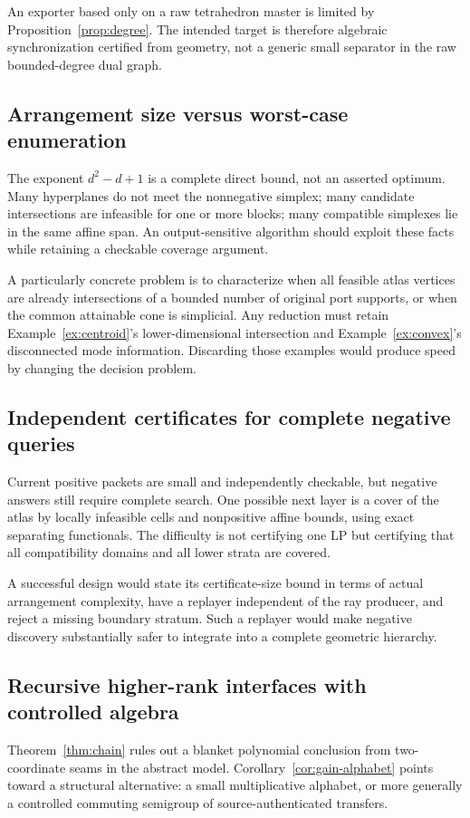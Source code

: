 \documentclass[11pt,a4paper]{article}
\theoremstyle{definition}
\theoremstyle{remark}
\begin{document}
An exporter based only on a raw tetrahedron master is limited by Proposition~\ref{prop:degree}. The intended target is therefore algebraic synchronization certified from geometry, not a generic small separator in the raw bounded-degree dual graph.

\subsection{Arrangement size versus worst-case enumeration}
The exponent $d^2-d+1$ is a complete direct bound, not an asserted optimum. Many hyperplanes do not meet the nonnegative simplex; many candidate intersections are infeasible for one or more blocks; many compatible simplexes lie in the same affine span. An output-sensitive algorithm should exploit these facts while retaining a checkable coverage argument.

A particularly concrete problem is to characterize when all feasible atlas vertices are already intersections of a bounded number of original port supports, or when the common attainable cone is simplicial. Any reduction must retain Example~\ref{ex:centroid}'s lower-dimensional intersection and Example~\ref{ex:convex}'s disconnected mode information. Discarding those examples would produce speed by changing the decision problem.

\subsection{Independent certificates for complete negative queries}
Current positive packets are small and independently checkable, but negative answers still require complete search. One possible next layer is a cover of the atlas by locally infeasible cells and nonpositive affine bounds, using exact separating functionals. The difficulty is not certifying one LP but certifying that all compatibility domains and all lower strata are covered.

A successful design would state its certificate-size bound in terms of actual arrangement complexity, have a replayer independent of the ray producer, and reject a missing boundary stratum. Such a replayer would make negative discovery substantially safer to integrate into a complete geometric hierarchy.

\subsection{Recursive higher-rank interfaces with controlled algebra}
Theorem~\ref{thm:chain} rules out a blanket polynomial conclusion from two-coordinate seams in the abstract model. Corollary~\ref{cor:gain-alphabet} points toward a structural alternative: a small multiplicative alphabet, or more generally a controlled commuting semigroup of source-authenticated transfers.
\end{document}
